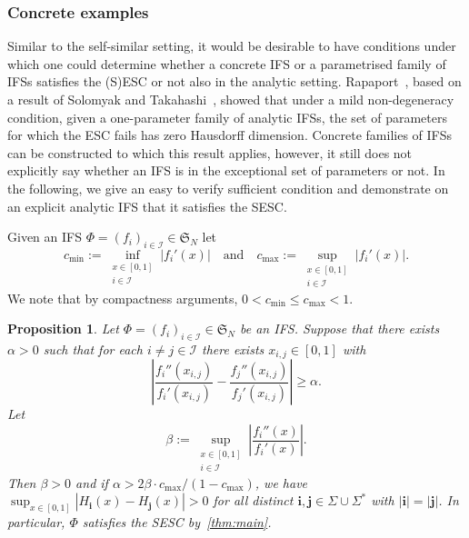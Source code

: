 \documentclass[11pt,]{article}
\def\cref#1{\ref{#1}}%
\newtheorem{proposition}[theorem]{Proposition}
\theoremstyle{definition}
\theoremstyle{remark}
\newcommand{\0}{\mathbf{0}}
\newcommand{\bi}{\mathbf{i}}
\newcommand{\bj}{\mathbf{j}}
\begin{document}
\subsubsection{Concrete examples}\label{sec:examples}
Similar to the self-similar setting, it would be desirable to have conditions under which one
could determine whether a concrete IFS or a parametrised family of IFSs satisfies the (S)ESC or not
also in the analytic setting. Rapaport~\cite[Corollary 1.4]{Rapaport_SelfConfESC25arXiv}, based on a
result of Solomyak and Takahashi~\cite{SolomyakTakahashi_IMRN21}, showed that under a mild
non-degeneracy condition, given a one-parameter family of analytic IFSs, the set of parameters for
which the ESC fails has zero Hausdorff dimension. Concrete families of IFSs can be constructed to
which this result applies, however, it still does not explicitly say whether an IFS is in the
exceptional set of parameters or not. 
In the following, we give an easy to verify sufficient condition and demonstrate on
an explicit analytic IFS that it satisfies the SESC. 

Given an IFS $\Phi=(f_i)_{i\in\mathcal{I}}\in\mathfrak{S}_N$ let
\begin{equation}\label{eq:maxmincontract}
  c_{\min} := \inf_{\substack{x\in[0,1] \\ i\in\mathcal{I}}} |f_i'(x)| \quad\text{and}\quad
  c_{\max}:=\sup_{\substack{x\in[0,1] \\ i\in\mathcal{I}}} |f_i'(x)|.
\end{equation}
We note that by compactness arguments, $0<c_{\min} \leq c_{\max} <1$.

\begin{proposition}\label{prop:example}
Let $\Phi=(f_i)_{i\in\mathcal{I}}\in\mathfrak{S}_N$ be an IFS. Suppose that there exists $\alpha>0$
such that for each $i\neq j\in\mathcal{I}$ there exists $x_{i,j}\in[0,1]$ with
\begin{equation*}
\left| \frac{f_i''(x_{i,j})}{f_i'(x_{i,j})} - \frac{f_j''(x_{i,j})}{f_j'(x_{i,j})} \right| \geq \alpha . 
\end{equation*}
Let
\begin{equation*}
  \beta:=\sup_{\substack{x\in[0,1] \\ i\in\mathcal{I}}} \left| \frac{f_i''(x)}{f_i'(x)} \right|.
\end{equation*}
Then $\beta>0$ and if $\alpha > 2\beta\cdot c_{\max}/(1-c_{\max})$, we have
$
\sup_{x\in[0,1]} |H_{\bi}(x) - H_{\bj}(x)| > 0 
$
for all distinct $\bi,\bj \in\Sigma\cup\Sigma^*$ with $|\bi|=|\bj|$. In particular, $\Phi$ satisfies
the SESC by~\cref{thm:main}.
\end{proposition}
\end{document}
